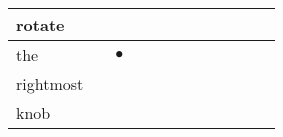 \documentclass[landscape]{article}
\newcommand{\ssp}{\hspace{2pt}}
\newcommand{\mex}{\cellcolor{g}$\bullet$}
\begin{document}
\begin{tabular}{|l|p{10pt}|p{10pt}|p{10pt}|p{10pt}|p{10pt}|p{10pt}|p{10pt}|p{10pt}|p{10pt}|p{10pt}|p{10pt}|}
\hline
\ssp rotate \ssp&\hspace{2pt}&\hspace{2pt}&\hspace{2pt}&\hspace{2pt}&\hspace{2pt}&\hspace{2pt}&\hspace{2pt}&\hspace{2pt}&\hspace{2pt}&\hspace{2pt}&\hspace{2pt}\\
\hline
\ssp \cellcolor{ref1}the \ssp&\hspace{2pt}&\hspace{2pt}\mex&\hspace{2pt}&\hspace{2pt}&\hspace{2pt}&\hspace{2pt}&\hspace{2pt}&\hspace{2pt}&\hspace{2pt}&\hspace{2pt}&\hspace{2pt}\\
\hline
\ssp rightmost \ssp&\hspace{2pt}&\hspace{2pt}&\hspace{2pt}&\hspace{2pt}&\hspace{2pt}&\hspace{2pt}&\hspace{2pt}&\hspace{2pt}&\hspace{2pt}&\hspace{2pt}&\hspace{2pt}\\
\hline
\ssp knob \ssp&\hspace{2pt}&\hspace{2pt}&\hspace{2pt}&\hspace{2pt}&\hspace{2pt}&\hspace{2pt}&\hspace{2pt}&\hspace{2pt}&\hspace{2pt}&\hspace{2pt}&\hspace{2pt}\\

\end{tabular}
\end{document}
